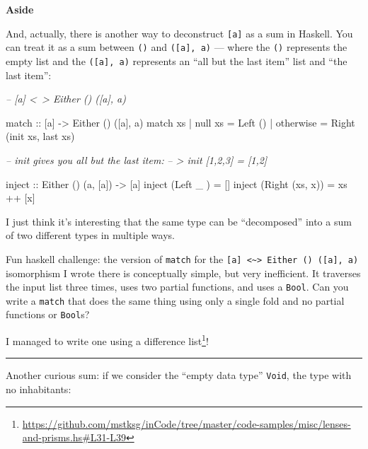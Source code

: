 \documentclass[]{article}
\newenvironment{Shaded}{}{}
\newcommand{\CommentTok}[1]{\textcolor[rgb]{0.38,0.63,0.69}{\textit{#1}}}
\newcommand{\DataTypeTok}[1]{\textcolor[rgb]{0.56,0.13,0.00}{#1}}
\newcommand{\FunctionTok}[1]{\textcolor[rgb]{0.02,0.16,0.49}{#1}}
\newcommand{\NormalTok}[1]{#1}
\newcommand{\OtherTok}[1]{\textcolor[rgb]{0.00,0.44,0.13}{#1}}
\renewcommand{\href}[2]{#2\footnote{\url{#1}}}
\begin{document}
\textbf{Aside}

And, actually, there is another way to deconstruct \texttt{{[}a{]}} as a sum in
Haskell. You can treat it as a sum between \texttt{()} and
\texttt{({[}a{]},\ a)} --- where the \texttt{()} represents the empty list and
the \texttt{({[}a{]},\ a)} represents an ``all but the last item'' list and
``the last item'':

\begin{Shaded}
\begin{Highlighting}[]
\CommentTok{-- [a] <~> Either () ([a], a)}

\OtherTok{match  ::}\NormalTok{ [a] }\OtherTok{->} \DataTypeTok{Either}\NormalTok{ () ([a], a)}
\NormalTok{match xs}
  \FunctionTok{|}\NormalTok{ null xs   }\FunctionTok{=} \DataTypeTok{Left}\NormalTok{  ()}
  \FunctionTok{|}\NormalTok{ otherwise }\FunctionTok{=} \DataTypeTok{Right}\NormalTok{ (init xs, last xs)}

\CommentTok{-- init gives you all but the last item:}
\CommentTok{-- > init [1,2,3] = [1,2]}

\OtherTok{inject ::} \DataTypeTok{Either}\NormalTok{ () (a, [a]) }\OtherTok{->}\NormalTok{ [a]}
\NormalTok{inject (}\DataTypeTok{Left}\NormalTok{   _     ) }\FunctionTok{=}\NormalTok{ []}
\NormalTok{inject (}\DataTypeTok{Right}\NormalTok{ (xs, x)) }\FunctionTok{=}\NormalTok{ xs }\FunctionTok{++}\NormalTok{ [x]}
\end{Highlighting}
\end{Shaded}

I just think it's interesting that the same type can be ``decomposed'' into a
sum of two different types in multiple ways.

Fun haskell challenge: the version of \texttt{match} for the
\texttt{{[}a{]}\ \textless{}\textasciitilde{}\textgreater{}\ Either\ ()\ ({[}a{]},\ a)}
isomorphism I wrote there is conceptually simple, but very inefficient. It
traverses the input list three times, uses two partial functions, and uses a
\texttt{Bool}. Can you write a \texttt{match} that does the same thing using
only a single fold and no partial functions or \texttt{Bool}s?

I managed to write one
\href{https://github.com/mstksg/inCode/tree/master/code-samples/misc/lenses-and-prisms.hs\#L31-L39}{using
a difference list}!

\begin{center}\rule{0.5\linewidth}{\linethickness}\end{center}

Another curious sum: if we consider the ``empty data type'' \texttt{Void}, the
type with no inhabitants:
\end{document}

